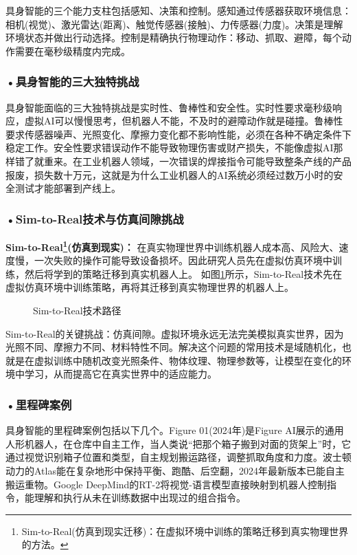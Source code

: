 具身智能的三个能力支柱包括感知、决策和控制。感知通过传感器获取环境信息：相机(视觉)、激光雷达(距离)、触觉传感器(接触)、力传感器(力度)。决策是理解环境状态并做出行动选择。控制是精确执行物理动作：移动、抓取、避障，每个动作需要在毫秒级精度内完成。

\subsubsection*{\textbf{•具身智能的三大独特挑战}}

具身智能面临的三大独特挑战是实时性、鲁棒性和安全性。实时性要求毫秒级响应，虚拟AI可以慢慢思考，但机器人不能，不及时的避障动作就是碰撞。鲁棒性要求传感器噪声、光照变化、摩擦力变化都不影响性能，必须在各种不确定条件下稳定工作。安全性要求错误动作不能导致物理伤害或财产损失，不能像虚拟AI那样错了就重来。在工业机器人领域，一次错误的焊接指令可能导致整条产线的产品报废，损失数十万元，这就是为什么工业机器人的AI系统必须经过数万小时的安全测试才能部署到产线上。


\subsubsection*{\textbf{•Sim-to-Real技术与仿真间隙挑战}}
\textbf{\textbf{Sim-to-Real}\footnote{Sim-to-Real(仿真到现实迁移)：在虚拟环境中训练的策略迁移到真实物理世界的方法。}(仿真到现实)：} 在真实物理世界中训练机器人成本高、风险大、速度慢，一次失败的操作可能导致设备损坏。因此研究人员先在虚拟仿真环境中训练，然后将学到的策略迁移到真实机器人上。 如图\ref{fig:ch3_3_30}所示，Sim-to-Real技术先在虚拟仿真环境中训练策略，再将其迁移到真实物理世界的机器人上。

\begin{figure}[H]
\centering
{}
\caption{Sim-to-Real技术路径}
\label{fig:ch3_3_30}
\end{figure}

Sim-to-Real的关键挑战：仿真间隙。虚拟环境永远无法完美模拟真实世界，因为光照不同、摩擦力不同、材料特性不同。解决这个问题的常用技术是域随机化，也就是在虚拟训练中随机改变光照条件、物体纹理、物理参数等，让模型在变化的环境中学习，从而提高它在真实世界中的适应能力。

\subsubsection*{\textbf{•里程碑案例}}


具身智能的里程碑案例包括以下几个。Figure 01(2024年)是Figure AI展示的通用人形机器人，在仓库中自主工作，当人类说“把那个箱子搬到对面的货架上”时，它通过视觉识别箱子位置和类型，自主规划搬运路径，调整抓取角度和力度。波士顿动力的Atlas能在复杂地形中保持平衡、跑酷、后空翻，2024年最新版本已能自主搬运重物。Google DeepMind的RT-2将视觉-语言模型直接映射到机器人控制指令，能理解和执行从未在训练数据中出现过的组合指令。

